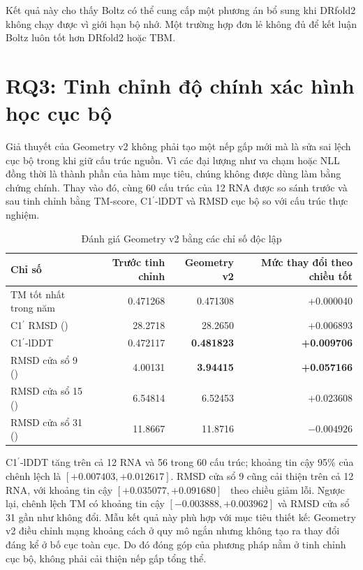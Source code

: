 \documentclass[12pt,a4paper,oneside]{report}
\newcommand{\cprime}{C1$^{\prime}$}
\newcommand{\angstrom}{\text{\AA}}
\begin{document}
Kết quả này cho thấy Boltz có thể cung cấp một phương án bổ sung khi DRfold2 không chạy
được vì giới hạn bộ nhớ. Một trường hợp đơn lẻ không đủ để kết luận Boltz luôn tốt hơn
DRfold2 hoặc TBM.

\iffalse
\section{RQ3: Tinh chỉnh độ chính xác hình học cục bộ}

Giả thuyết của Geometry v2 không phải tạo một nếp gấp mới mà là sửa sai lệch cục bộ
trong khi giữ cấu trúc nguồn. Vì các đại lượng như va chạm hoặc NLL đồng thời là thành
phần của hàm mục tiêu, chúng không được dùng làm bằng chứng chính. Thay vào đó, cùng 60
cấu trúc của 12 RNA được so sánh trước và sau tinh chỉnh bằng TM-score,
\cprime{}-lDDT và RMSD cục bộ so với cấu trúc thực nghiệm.

\begin{table}[H]
\centering
\caption{Đánh giá Geometry v2 bằng các chỉ số độc lập}
\begin{tabular}{lrrr}
\toprule
Chỉ số & Trước tinh chỉnh & Geometry v2 & Mức thay đổi theo chiều tốt\\
\midrule
TM tốt nhất trong năm & 0.471268 & 0.471308 & +0.000040\\
\cprime{} RMSD (\angstrom) & 28.2718 & 28.2650 & +0.006893\\
\cprime{}-lDDT & 0.472117 & \textbf{0.481823} & \textbf{+0.009706}\\
RMSD cửa sổ 9 (\angstrom) & 4.00131 & \textbf{3.94415} & \textbf{+0.057166}\\
RMSD cửa sổ 15 (\angstrom) & 6.54814 & 6.52453 & +0.023608\\
RMSD cửa sổ 31 (\angstrom) & 11.8667 & 11.8716 & $-0.004926$\\
\bottomrule
\end{tabular}
\end{table}

\cprime{}-lDDT tăng trên cả 12 RNA và 56 trong 60 cấu trúc; khoảng tin cậy 95\% của
chênh lệch là $[+0.007403,+0.012617]$. RMSD cửa sổ 9 cũng cải thiện trên cả 12 RNA,
với khoảng tin cậy $[+0.035077,+0.091680]$~\angstrom{} theo chiều giảm lỗi. Ngược lại,
chênh lệch TM có khoảng tin cậy $[-0.003888,+0.003962]$ và RMSD cửa sổ 31 gần như
không đổi. Mẫu kết quả này phù hợp với mục tiêu thiết kế: Geometry v2 điều chỉnh mạng
khoảng cách ở quy mô ngắn nhưng không tạo ra thay đổi đáng kể ở bố cục toàn cục. Do đó
đóng góp của phương pháp nằm ở tinh chỉnh cục bộ, không phải cải thiện nếp gấp tổng thể.
\end{document}
